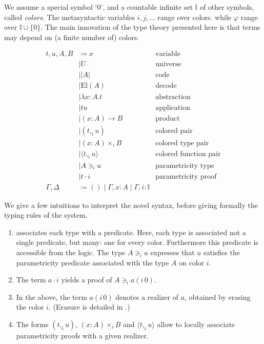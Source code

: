 \documentclass[english]{PaperTools/latex/lipics}
\newcommand\CP[3]{(#2,_{#1} #3)}
\newcommand\CTimes[2]{(#2) ×_{#1}}
\newcommand\param[1]{\!\cdot\!#1}
\newcommand\op[1]{∋_{#1}}
\newcommand\fp[3]{⟨#2 ,_{#1} #3⟩}
\newcommand\mor[2]{({#1}\,{#2})}
\newcommand\proj[2]{{#2}\mor{#1}0}
\def\El#1{\mathrm{El}(#1)}
\begin{document}
We assume a special symbol ‘0’, and a countable infinite set $𝕀$ of
other symbols, called \emph{colors}.
The metasyntactic variables $i,j,\ldots$ range over colors.
while $φ$ range over $𝕀 ∪ \{0\}$.
%
The main innovation of the type theory
presented here is that terms may depend on (a finite number of)
colors.
\begin{definition}
  \begin{align*}
    t,u,A,B & \coloneqq x & \text {variable} \\
            & \mid U & \text{universe} \\ 
            & \mid |A| & \text{code} \\ 
            & \mid \El{A} & \text{decode} \\
            & \mid λx:A. t & \text{abstraction} \\
            & \mid t u & \text{application} \\ 
            & \mid (x:A) → B & \text{product} \\
            & \mid \CP i t u & \text{colored pair} \\
            & \mid \CTimes i {x:A} B  & \text{colored type pair} \\
            & \mid \fp i t u & \text{colored function pair}\\
            & \mid A \op i u & \text{parametricity type} \\
            & \mid t \param i & \text{parametricity proof} \\
    \Gamma,\Delta & \coloneqq () \mid \Gamma,x:A \mid \Gamma,i:𝕀
  \end{align*}
\end{definition}

We give a few intuitions to interpret the novel syntax, before giving formally the typing rules of the system. 
\begin{enumerate}
\item \citet{reynolds_types_1983} associates each type with a
  predicate. Here, each type is associated not a single predicate, but
  many: one for every color. Furthermore this predicate is accessible
  from the logic. The type $A \op i u$ expresses that $u$ satisfies
  the parametricity predicate associated with the type $A$ on color
  $i$.
\item The term $a \param i$ yields a proof of $A \op i \proj i a$.
\item In the above, the term $\proj i a$ denotes a realizer of $a$,
  obtained by erasing the color $i$. (Erasure is detailed in
  .)
\item The forms $\CP i t u$, $\CTimes i {x:A} B$ and $\fp i t u$ allow to
  locally associate parametricity proofs with a given realizer.
\end{enumerate}
\end{document}
